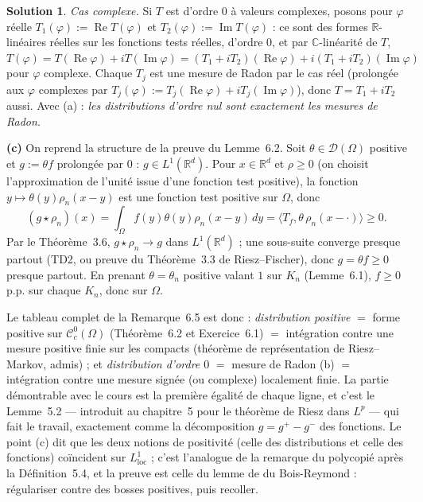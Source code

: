 \documentclass[11pt,a4paper]{article}
\newcommand{\R}{\mathbb{R}}
\newcommand{\C}{\mathbb{C}}
\newcommand{\Cc}{\mathcal{C}^0_c}
\newcommand{\D}{\mathcal{D}}
\renewcommand{\Re}{\operatorname{Re}}
\renewcommand{\Im}{\operatorname{Im}}
\theoremstyle{definition}
\newtheorem*{solution}{Solution}
\begin{document}
\begin{solution}
\emph{Cas complexe.} Si $T$ est d'ordre $0$ à valeurs complexes, posons pour $\varphi$ réelle $T_1(\varphi):=\Re T(\varphi)$ et $T_2(\varphi):=\Im T(\varphi)$ : ce sont des formes $\R$-linéaires réelles sur les fonctions tests réelles, d'ordre $0$, et par $\C$-linéarité de $T$, $T(\varphi)=T(\Re\varphi)+iT(\Im\varphi)=(T_1+iT_2)(\Re\varphi)+i(T_1+iT_2)(\Im\varphi)$ pour $\varphi$ complexe. Chaque $T_j$ est une mesure de Radon par le cas réel (prolongée aux $\varphi$ complexes par $T_j(\varphi):=T_j(\Re\varphi)+iT_j(\Im\varphi)$), donc $T=T_1+iT_2$ aussi. Avec (a) : \emph{les distributions d'ordre nul sont exactement les mesures de Radon.}

\medskip
\noindent\textbf{(c)} On reprend la structure de la preuve du Lemme~6.2. Soit $\theta\in\D(\Omega)$ positive et $g:=\theta f$ prolongée par $0$ : $g\in L^1(\R^d)$. Pour $x\in\R^d$ et $\rho\ge0$ (on choisit l'approximation de l'unité issue d'une fonction test positive), la fonction $y\mapsto\theta(y)\rho_n(x-y)$ est une fonction test positive sur $\Omega$, donc
\[
(g\star\rho_n)(x)=\int_\Omega f(y)\theta(y)\rho_n(x-y)\,dy=\big\langle T_f,\theta\,\rho_n(x-\cdot)\big\rangle\ge0 .
\]
Par le Théorème~3.6, $g\star\rho_n\to g$ dans $L^1(\R^d)$ ; une sous-suite converge presque partout (TD2, ou preuve du Théorème~3.3 de Riesz--Fischer), donc $g=\theta f\ge0$ presque partout. En prenant $\theta=\theta_n$ positive valant $1$ sur $K_n$ (Lemme~6.1), $f\ge0$ p.p. sur chaque $K_n$, donc sur $\Omega$.
\end{solution}

\begin{commentaire}
Le tableau complet de la Remarque~6.5 est donc : \emph{distribution positive} $=$ forme positive sur $\Cc(\Omega)$ (Théorème~6.2 et Exercice~6.1) $=$ intégration contre une mesure positive finie sur les compacts (théorème de représentation de Riesz--Markov, admis) ; et \emph{distribution d'ordre $0$} $=$ mesure de Radon (b) $=$ intégration contre une mesure signée (ou complexe) localement finie. La partie démontrable avec le cours est la première égalité de chaque ligne, et c'est le Lemme~5.2 — introduit au chapitre~5 pour le théorème de Riesz dans $L^p$ — qui fait le travail, exactement comme la décomposition $g=g^+-g^-$ des fonctions. Le point (c) dit que les deux notions de positivité (celle des distributions et celle des fonctions) coïncident sur $L^1_{\mathrm{loc}}$ ; c'est l'analogue de la remarque du polycopié après la Définition~5.4, et la preuve est celle du lemme de du Bois-Reymond : régulariser contre des bosses positives, puis recoller.
\end{commentaire}
\end{document}
